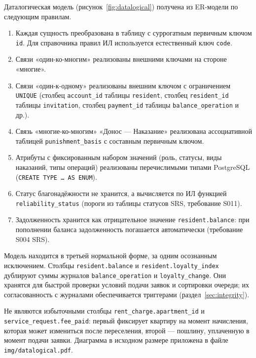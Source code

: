 \documentclass[12pt,a4paper]{article}
\begin{document}
Даталогическая модель (рисунок~\ref{fig:datalogical}) получена из ER-модели по следующим правилам.
\begin{enumerate}
  \item Каждая сущность преобразована в таблицу с суррогатным первичным ключом \texttt{id}.
        Для справочника правил ИЛ используется естественный ключ \texttt{code}.
  \item Связи «один-ко-многим» реализованы внешними ключами на стороне «многие».
  \item Связи «один-к-одному» реализованы внешним ключом с ограничением \texttt{UNIQUE}
        (столбец \texttt{account\_\allowbreak{}id} таблицы \texttt{resident}, столбец \texttt{resident\_\allowbreak{}id}
        таблицы \texttt{invitation}, столбец \texttt{payment\_\allowbreak{}id} таблицы \texttt{balance\_\allowbreak{}operation} и др.).
  \item Связь «многие-ко-многим» «Донос — Наказание» реализована ассоциативной таблицей
        \texttt{punishment\_\allowbreak{}basis} с составным первичным ключом.
  \item Атрибуты с фиксированным набором значений (роль, статусы, виды наказаний, типы операций)
        реализованы перечислимыми типами PostgreSQL (\texttt{CREATE TYPE \dots{} AS ENUM}).
  \item Статус благонадёжности не хранится, а вычисляется по ИЛ функцией
        \texttt{reliability\_\allowbreak{}status} (пороги из таблицы статусов SRS, требование S011).
  \item Задолженность хранится как отрицательное значение \texttt{resident.\allowbreak{}balance}: при пополнении
        баланса задолженность погашается автоматически (требование S004 SRS).
\end{enumerate}

Модель находится в третьей нормальной форме, за одним осознанным исключением.
Столбцы \texttt{resident.\allowbreak{}balance} и \texttt{resident.\allowbreak{}loyalty\_\allowbreak{}index} дублируют суммы журналов
\texttt{balance\_\allowbreak{}operation} и \texttt{loyalty\_\allowbreak{}change}. Они хранятся для быстрой проверки условий
подачи заявок и сортировки очереди; их согласованность с журналами обеспечивается триггерами
(раздел~\ref{sec:integrity}).

Не являются избыточными столбцы \texttt{rent\_\allowbreak{}charge.\allowbreak{}apartment\_\allowbreak{}id} и
\texttt{service\_\allowbreak{}request.\allowbreak{}fee\_\allowbreak{}paid}: первый фиксирует квартиру на момент начисления, которая может
измениться после переселения, второй --- пошлину, уплаченную в момент подачи заявки.
Диаграмма в исходном размере приложена в файле \texttt{img/datalogical.pdf}.
\end{document}
